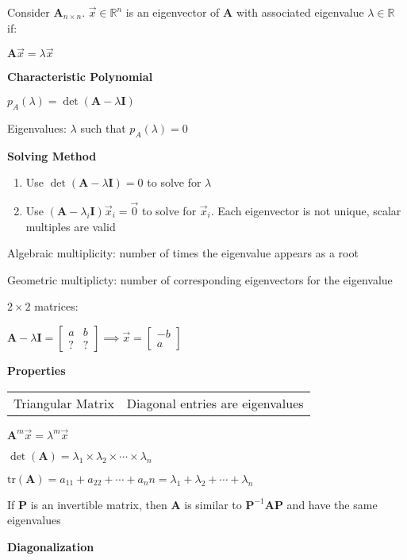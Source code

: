 \documentclass[10pt]{article}
\newcommand{\R}{{\mathbb R}}
\newcommand{\matr}[1]{\mathbf{#1}}
\newcommand{\inv}{^{-1}}
\newcommand\heading[1]{\medskip\textbf{#1}\medskip}
\begin{document}
\begin{multicols*}{3}
Consider $\matr{A}_{n\times n}$. $\vec x\in\R^n$ is an eigenvector of $\matr{A}$ with associated eigenvalue $\lambda\in\R$ if:

$\matr{A}\vec x=\lambda\vec x$

\heading{Characteristic Polynomial}

$p_A(\lambda)=\det(\matr{A}-\lambda\matr{I})$

Eigenvalues: $\lambda$ such that $p_A(\lambda)=0$

\heading{Solving Method}

\begin{enumerate}[noitemsep,topsep=0pt]
    \item Use $\det(\matr{A}-\lambda\matr{I})=0$ to solve for $\lambda$
    \item Use $(\matr{A}-\lambda_i\matr{I})\vec x_i=\vec 0$ to solve for $\vec x_i$. Each eigenvector is not unique, scalar multiples are valid
\end{enumerate}

Algebraic multiplicity: number of times the eigenvalue appears as a root 

Geometric multiplicty: number of corresponding eigenvectors for the eigenvalue

$2\times 2$ matrices:

$\matr{A}-\lambda\matr{I}=\begin{bmatrix}
    a & b \\
    ? & ?
\end{bmatrix}\implies\vec x=\begin{bmatrix}
    -b \\
    a
\end{bmatrix}$

\heading{Properties}

\begin{tabular}{@{}ll}
    Triangular Matrix & Diagonal entries are eigenvalues \\
\end{tabular}

$\matr{A}^m\vec x=\lambda^m\vec x$

$\det(\matr{A})=\lambda_1\times\lambda_2\times\cdots\times\lambda_n$

$\mathrm{tr}(\matr{A})=a_11+a_22+\cdots+a_nn=\lambda_1+\lambda_2+\cdots+\lambda_n$

If $\matr{P}$ is an invertible matrix, then $\matr{A}$ is similar to $\matr{P}\inv\matr{A}\matr{P}$ and have the same eigenvalues

\heading{Diagonalization}


\end{multicols*}
\end{document}
